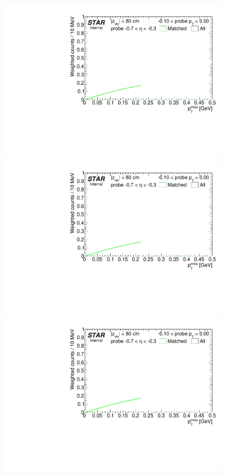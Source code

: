 \begin{figure}[h!]
{}~
\parbox{0.24\textwidth}{
  \centering
  \includegraphics[width=\linewidth,page=5]{graphics/correctionsToEff/TOF_tagAndProbe/Fitting_effVsPt_mc_ETABINS_D.CPT2.pdf}\\
  \includegraphics[width=\linewidth,page=7]{graphics/correctionsToEff/TOF_tagAndProbe/Fitting_effVsPt_mc_ETABINS_D.CPT2.pdf}\\
  \includegraphics[width=\linewidth,page=9]{graphics/correctionsToEff/TOF_tagAndProbe/Fitting_effVsPt_mc_ETABINS_D.CPT2.pdf}\\
}
\end{figure}
